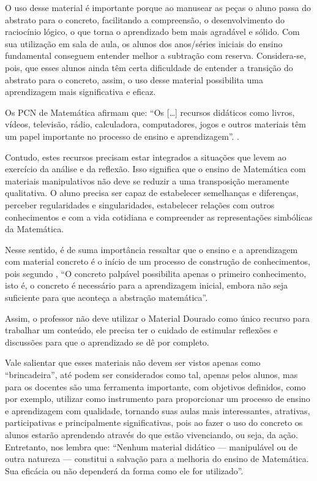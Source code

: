 \begin{refsection}
    O uso desse material é importante porque ao manusear as peças o aluno passa do abstrato para o concreto, facilitando a compreensão, o desenvolvimento do raciocínio lógico, o que torna o aprendizado bem mais agradável e sólido. Com sua utilização em sala de aula, os alunos dos anos/séries iniciais do ensino fundamental conseguem entender melhor a subtração com reserva. Considera-se, pois, que esses alunos ainda têm certa dificuldade de entender a transição do abstrato para o concreto, assim, o uso desse material possibilita uma aprendizagem mais significativa e eficaz. 

    Os PCN de Matemática afirmam que: “Os [\dots] recursos didáticos como livros, vídeos, televisão, rádio, calculadora, computadores, jogos e outros materiais têm um papel importante no processo de ensino e aprendizagem”. \cite[p.~57]{ParâmetrosCurricularesMatematica1998}.

    Contudo, estes recursos precisam estar integrados a situações que levem ao exercício da análise e da reflexão. Isso significa que o ensino de Matemática com materiais manipulativos não deve se reduzir a uma transposição meramente qualitativa. O aluno precisa ser capaz de estabelecer semelhanças e diferenças, perceber regularidades e singularidades, estabelecer relações com outros conhecimentos e com a vida cotidiana e compreender as representações simbólicas da Matemática.  

    Nesse sentido, é de suma importância ressaltar que o ensino e a aprendizagem com material concreto é o início de um processo de construção de conhecimentos, pois segundo \textcite[p.~20]{LORENZATO2006Começar}, “O concreto palpável possibilita apenas o primeiro conhecimento, isto é, o concreto é necessário para a aprendizagem inicial, embora não seja suficiente para que aconteça a abstração matemática”.

    Assim, o professor não deve utilizar o Material Dourado como único recurso para trabalhar um conteúdo, ele precisa ter o cuidado de estimular reflexões e discussões para que o aprendizado se dê por completo.  

    Vale salientar que esses materiais não devem ser vistos apenas como “brincadeira”, até podem ser considerados como tal, apenas pelos alunos, mas para os docentes são uma ferramenta importante, com objetivos definidos, como por exemplo, utilizar como instrumento para proporcionar um processo de ensino e aprendizagem com qualidade, tornando suas aulas mais interessantes, atrativas, participativas e principalmente significativas, pois ao fazer o uso do concreto os alunos estarão aprendendo através do que estão vivenciando, ou seja, da ação. Entretanto, \textcite[p.~5]{NACARATO2005trabalho} nos lembra que: “Nenhum material didático --- manipulável ou de outra natureza --- constitui a salvação para a melhoria do ensino de Matemática. Sua eficácia ou não dependerá da forma como ele for utilizado”. 


\end{refsection}
